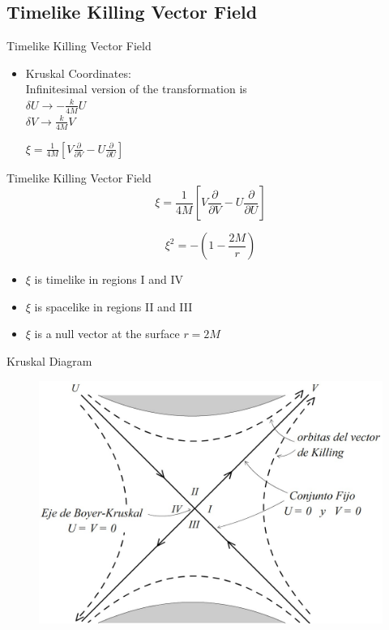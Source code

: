 \documentclass{beamer}
\begin{document}
 	\subsection{Timelike Killing Vector Field}       
        \begin{frame}{Timelike Killing Vector Field}
			\begin{itemize}
			\item Kruskal Coordinates: \\
            Infinitesimal version of the transformation is\\
            $ \delta U  \longrightarrow  -\frac{k}{4M}U$\\
			$ \delta V  \longrightarrow  \frac{k}{4M}V$
            \pause
            \bigskip
            
            $\xi = \frac{1}{4M} \left[ V \frac{\partial}{\partial V} - U \frac{\partial}{\partial U} \right]$
			\end{itemize}
        \end{frame}
        
        \begin{frame}{Timelike Killing Vector Field}
            $$\xi = \frac{1}{4M} \left[ V \frac{\partial}{\partial V} - U \frac{\partial}{\partial U} \right]$$
            \bigskip
            
            $$\xi^{2} = - \left( 1 - \frac{2M}{r} \right)$$

			\begin{itemize}
			\item $\xi$ is timelike in regions I and IV
        	\pause 
        	\item $\xi$ is spacelike in regions II and III
        	\pause 
        	\item $\xi$ is a null vector at the surface $r=2M$
			\end{itemize} 
		\end{frame}
        
        \begin{frame}{Kruskal Diagram}
        	\begin{center}
				\begin{figure}
				\includegraphics[scale=0.75] {fig7.jpg}
				\end{figure}
			\end{center}	
        \end{frame}
        
\end{document}
